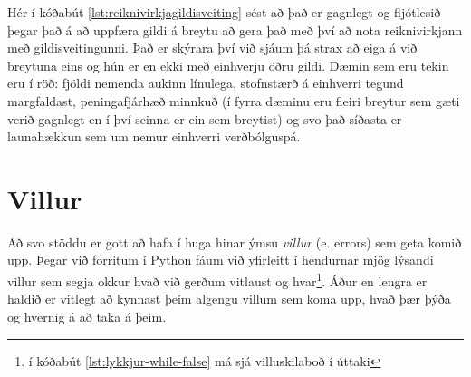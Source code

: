 Hér í kóðabút \ref{lst:reiknivirkjagildisveiting} sést að það er gagnlegt og fljótlesið þegar það á að uppfæra gildi á breytu að gera það með því að nota reiknivirkjann með gildisveitingunni.
Það er skýrara því við sjáum þá strax að eiga á við breytuna eins og hún er en ekki með einhverju öðru gildi.
Dæmin sem eru tekin eru í röð: fjöldi nemenda aukinn línulega, stofnstærð á einhverri tegund margfaldast, peningafjárhæð minnkuð (í fyrra dæminu eru fleiri breytur sem gæti verið gagnlegt en í því seinna er ein sem breytist) og svo það síðasta er launahækkun sem um nemur einhverri verðbólguspá.

\section{Villur}\label{uk:tolur-villur}
Að svo stöddu er gott að hafa í huga hinar ýmsu \emph{villur} (e. errors) sem geta komið upp.
Þegar við forritum í Python fáum við yfirleitt í hendurnar mjög lýsandi villur sem segja okkur hvað við gerðum vitlaust og hvar\footnote{í kóðabút \ref{lst:lykkjur-while-false} má sjá villuskilaboð í úttaki}.
Áður en lengra er haldið er vitlegt að kynnast þeim algengu villum sem koma upp, hvað þær þýða og hvernig á að taka á þeim.

